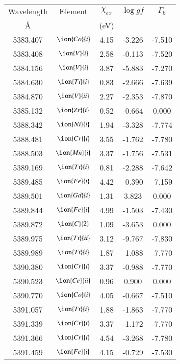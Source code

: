\documentclass[fleqn,usenatbib]{mnras}
\begin{document}
 \begin{center}
 \begin{table}
 \begin{tabular}{ccccc}
 \hline
 Wavelength & Element & $\chi_{ex}$ &  $\log gf$ & $\varGamma_{6}$ \\
   \AA{}    &         &  (eV)       &            &                 \\
 \hline
5383.407 &  $\ion{Co}{i}$  & 4.15 & -3.226 & -7.510 \\ 
5383.408 &  $\ion{V}{i}$  & 2.58 & -0.113 & -7.520 \\ 
5384.156 &  $\ion{V}{i}$  & 3.87 & -5.883 & -7.270 \\ 
5384.630 &  $\ion{Ti}{i}$  & 0.83 & -2.666 & -7.639 \\ 
5384.870 &  $\ion{V}{ii}$  & 2.27 & -2.353 & -7.870 \\ 
5385.132 &  $\ion{Zr}{i}$  & 0.52 & -0.664 & 0.000 \\ 
5388.342 &  $\ion{Ni}{i}$  & 1.94 & -3.328 & -7.774 \\ 
5388.481 &  $\ion{Cr}{i}$  & 3.55 & -1.762 & -7.780 \\ 
5388.503 &  $\ion{Mn}{i}$  & 3.37 & -1.756 & -7.531 \\ 
5389.169 &  $\ion{Ti}{i}$  & 0.81 & -2.288 & -7.642 \\ 
5389.485 &  $\ion{Fe}{i}$  & 4.42 & -0.390 & -7.159 \\ 
5389.501 &  $\ion{Gd}{i}$  & 1.31 & 3.823 & 0.000 \\ 
5389.844 &  $\ion{Fe}{i}$  & 4.99 & -1.503 & -7.430 \\ 
5389.872 &  $\ion{C}{2}$ & 1.09 & -3.653 & 0.000 \\ 
5389.975 &  $\ion{Ti}{ii}$  & 3.12 & -9.767 & -7.830 \\ 
5389.989 &  $\ion{Ti}{i}$  & 1.87 & -1.088 & -7.770 \\ 
5390.380 &  $\ion{Cr}{i}$  & 3.37 & -0.988 & -7.770 \\ 
5390.523 &  $\ion{Ce}{ii}$  & 0.96 & 0.900 & 0.000 \\ 
5390.770 &  $\ion{Co}{i}$  & 4.05 & -0.667 & -7.510 \\ 
5391.057 &  $\ion{Ti}{i}$  & 1.88 & -1.863 & -7.770 \\ 
5391.339 &  $\ion{Cr}{i}$  & 3.37 & -1.172 & -7.770 \\ 
5391.366 &  $\ion{Cr}{i}$  & 4.54 & -3.268 & -7.780 \\ 
5391.459 &  $\ion{Fe}{i}$  & 4.15 & -0.729 & -7.530 \\ 

\end{tabular}
\end{table}
\end{center}
\end{document}
